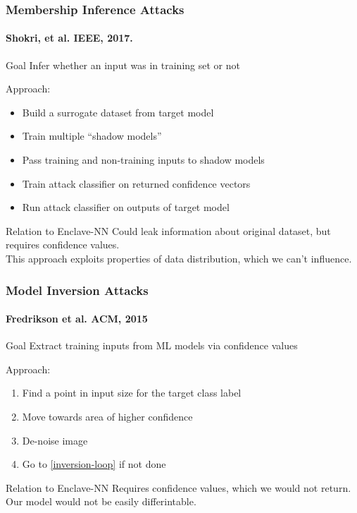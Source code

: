 \documentclass[aspectratio=169,nototalframenumber]{beamer}
\begin{document}
\begin{frame}
  \frametitle{Membership Inference Attacks}
  \framesubtitle{\small Shokri, et al. IEEE, 2017.}
  \begin{block}{Goal}
    Infer whether an input was in training set or not
  \end{block}
  \pause
  Approach:
  \begin{itemize}
  \item Build a surrogate dataset from target model
  \item Train multiple ``shadow models''
  \item Pass training and non-training inputs to shadow models
  \item Train attack classifier on returned confidence vectors
  \item Run attack classifier on outputs of target model
  \end{itemize}
  \pause
  \begin{alertblock}{Relation to Enclave-NN}
    Could leak information about original dataset, but requires confidence values.\\
    This approach exploits properties of data distribution, which we can't influence.
  \end{alertblock}
\end{frame}

\begin{frame}
  \frametitle{Model Inversion Attacks}
  \framesubtitle{\small Fredrikson et al. ACM, 2015}
  \begin{block}{Goal}
    Extract training inputs from ML models via confidence values
  \end{block}
  \pause
  Approach:
  \begin{enumerate}
  \item Find a point in input size for the target class label
  \item \label{inversion-loop} Move towards area of higher confidence
  \item De-noise image
  \item Go to \ref{inversion-loop} if not done
  \end{enumerate}
  \pause
  \begin{alertblock}{Relation to Enclave-NN}
    Requires confidence values, which we would not return.\\
    Our model would not be easily differintable.
  \end{alertblock}
\end{frame}
\end{document}
